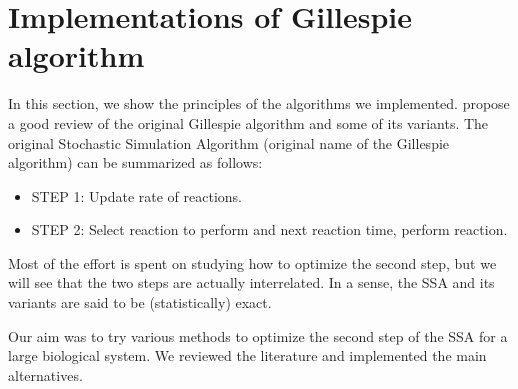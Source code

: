 \graphicspath{{\relativepath/figures/}}

\section{Implementations of Gillespie algorithm}
\label{sec:algorithm}

In this section, we show the principles of the algorithms we implemented.
\citet{gillespie_perspective:_2013} propose a good review of the original Gillespie algorithm and some of its variants.
The original Stochastic Simulation Algorithm
(original name of the Gillespie algorithm)
can be summarized as follows:

\begin{itemize}
\item STEP 1: Update rate of reactions.
\item STEP 2: Select reaction to perform and next reaction time, perform reaction.
\end{itemize}

Most of the effort is spent on studying how to optimize the second step,
but we will see that the two steps are actually interrelated.
In a sense, the SSA and its variants are said to be (statistically) exact.

Our aim was to try various methods to optimize the second step of the SSA for a large biological system.
We reviewed the literature and implemented the main alternatives.




